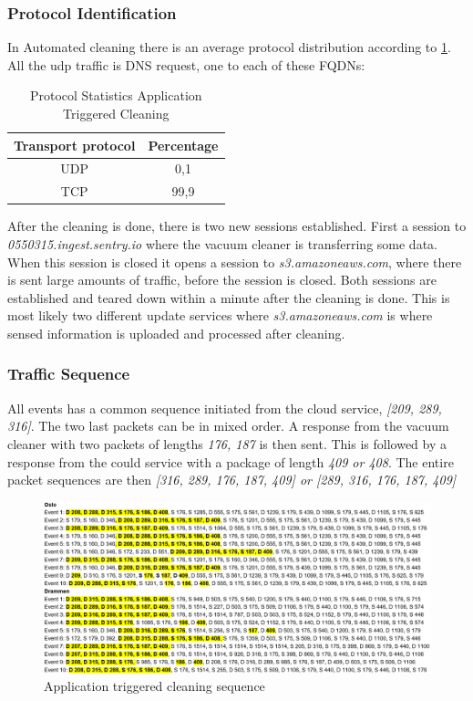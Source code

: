 \subsubsection{Protocol Identification}
In Automated cleaning there is an average protocol distribution according to \ref{tab:tcanalysisdist}. All the udp traffic is DNS request, one to each of these FQDNs:

\begin{table}[H]
\centering
\caption{Protocol Statistics Application Triggered Cleaning}
\label{tab:tcanalysisdist}
\begin{tabular}{|c|c|}
\hline
\textbf{Transport protocol} & \textbf{Percentage} \\ \hline
UDP                         & 0,1                 \\ \hline
TCP                         & 99,9                \\ \hline
\end{tabular}
\end{table}



After the cleaning is done, there is two new sessions established. First a session to \textit{0550315.ingest.sentry.io} where the vacuum cleaner is transferring some data. When this session is closed it opens a session to \textit{s3.amazoneaws.com}, where there is sent large amounts of traffic, before the session is closed. Both sessions are established and teared down within a minute after the cleaning is done. This is most likely two different update services where \textit{s3.amazoneaws.com} is where sensed information is uploaded and processed after cleaning.

\subsubsection{Traffic Sequence}
All events has a common sequence initiated from the cloud service, \textit{[209, 289, 316]}. The two last packets can be in mixed order. A response from the vacuum cleaner with two packets of lengths \textit{176, 187} is then sent. This is followed by a response from the could service with a package of length \textit{409 or 408}. The entire packet sequences are then \textit{[316, 289, 176, 187, 409] or [289, 316, 176, 187, 409]
}

\begin{figure}[H]
    \centering
    \includegraphics[width=\textwidth]{figures/Sequence_ATC.png}
    \caption{Application triggered cleaning sequence}
    \label{fig:ATCseq}
\end{figure}

